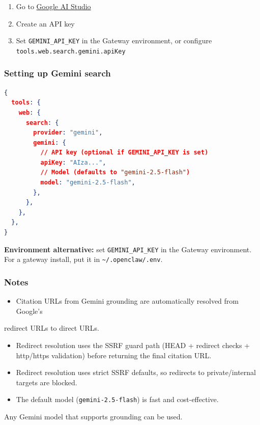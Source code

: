 \begin{enumerate}
  \item Go to \href{https://aistudio.google.com/apikey}{Google AI Studio}
  \item Create an API key
  \item Set \texttt{GEMINI\_API\_KEY} in the Gateway environment, or configure \texttt{tools.web.search.gemini.apiKey}
\end{enumerate}


\subsubsection{Setting up Gemini search}


\begin{lstlisting}[language=json]
{
  tools: {
    web: {
      search: {
        provider: "gemini",
        gemini: {
          // API key (optional if GEMINI_API_KEY is set)
          apiKey: "AIza...",
          // Model (defaults to "gemini-2.5-flash")
          model: "gemini-2.5-flash",
        },
      },
    },
  },
}
\end{lstlisting}


\textbf{Environment alternative:} set \texttt{GEMINI\_API\_KEY} in the Gateway environment.
For a gateway install, put it in \texttt{\textasciitilde{}/.openclaw/.env}.

\subsubsection{Notes}


\begin{itemize}
  \item Citation URLs from Gemini grounding are automatically resolved from Google's
\end{itemize}

redirect URLs to direct URLs.
\begin{itemize}
  \item Redirect resolution uses the SSRF guard path (HEAD + redirect checks + http/https validation) before returning the final citation URL.
  \item Redirect resolution uses strict SSRF defaults, so redirects to private/internal targets are blocked.
  \item The default model (\texttt{gemini-2.5-flash}) is fast and cost-effective.
\end{itemize}

Any Gemini model that supports grounding can be used.


